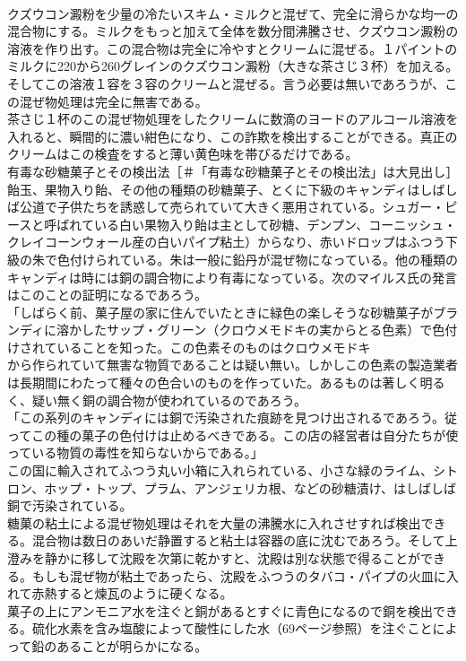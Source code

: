 \documentclass[8pt]{extreport}
\begin{document}
\begin{CJK}{UTF8}{min}
\\	クズウコン澱粉を少量の冷たいスキム・ミルクと混ぜて、完全に滑らかな均一の混合物にする。ミルクをもっと加えて全体を数分間沸騰させ、クズウコン澱粉の溶液を作り出す。この混合物は完全に冷やすとクリームに混ぜる。１パイントのミルクに220から260グレインのクズウコン澱粉（大きな茶さじ３杯）を加える。そしてこの溶液１容を３容のクリームと混ぜる。言う必要は無いであろうが、この混ぜ物処理は完全に無害である。
\\	茶さじ１杯のこの混ぜ物処理をしたクリームに数滴のヨードのアルコール溶液を入れると、瞬間的に濃い紺色になり、この詐欺を検出することができる。真正のクリームはこの検査をすると薄い黄色味を帯びるだけである。
\\	有毒な砂糖菓子とその検出法［＃「有毒な砂糖菓子とその検出法」は大見出し］
\\	飴玉、果物入り飴、その他の種類の砂糖菓子、とくに下級のキャンディはしばしば公道で子供たちを誘惑して売られていて大きく悪用されている。シュガー・ピースと呼ばれている白い果物入り飴は主として砂糖、デンプン、コーニッシュ・クレイコーンウォール産の白いパイプ粘土）からなり、赤いドロップはふつう下級の朱で色付けられている。朱は一般に鉛丹が混ぜ物になっている。他の種類のキャンディは時には銅の調合物により有毒になっている。次のマイルス氏の発言はこのことの証明になるであろう。
\\	「しばらく前、菓子屋の家に住んでいたときに緑色の楽しそうな砂糖菓子がブランディに溶かしたサップ・グリーン（クロウメモドキの実からとる色素）で色付けされていることを知った。この色素そのものはクロウメモドキ
\\	から作られていて無害な物質であることは疑い無い。しかしこの色素の製造業者は長期間にわたって種々の色合いのものを作っていた。あるものは著しく明るく、疑い無く銅の調合物が使われているのであろう。
\\	「この系列のキャンディには銅で汚染された痕跡を見つけ出されるであろう。従ってこの種の菓子の色付けは止めるべきである。この店の経営者は自分たちが使っている物質の毒性を知らないからである。」
\\	この国に輸入されてふつう丸い小箱に入れられている、小さな緑のライム、シトロン、ホップ・トップ、プラム、アンジェリカ根、などの砂糖漬け、はしばしば銅で汚染されている。
\\	糖菓の粘土による混ぜ物処理はそれを大量の沸騰水に入れさせすれば検出できる。混合物は数日のあいだ静置すると粘土は容器の底に沈むであろう。そして上澄みを静かに移して沈殿を次第に乾かすと、沈殿は別な状態で得ることができる。もしも混ぜ物が粘土であったら、沈殿をふつうのタバコ・パイプの火皿に入れて赤熱すると煉瓦のように硬くなる。
\\	菓子の上にアンモニア水を注ぐと銅があるとすぐに青色になるので銅を検出できる。硫化水素を含み塩酸によって酸性にした水（69ページ参照）を注ぐことによって鉛のあることが明らかになる。

\end{CJK}
\end{document}
